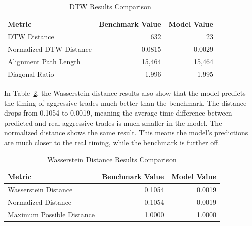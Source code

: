 \begin{table}[H]
    \centering
    \caption{DTW Results Comparison} \label{tb:dtw_com}
    \begin{tabular}{lrr}
    \toprule
    Metric & Benchmark Value & Model Value\\
    \midrule
    DTW Distance & 632 & 23 \\  %
    Normalized DTW Distance & 0.0815 & 0.0029 \\  %
    Alignment Path Length & 15,464 & 15,464 \\
    Diagonal Ratio & 1.996 & 1.995 \\   %
    \bottomrule
    \end{tabular}
\end{table}

In Table~\ref{tb:wasserstein_com}, the Wasserstein distance results also show that the model predicts the timing of aggressive trades much better than the benchmark. The distance drops from 0.1054 to 0.0019, meaning the average time difference between predicted and real aggressive trades is much smaller in the model. The normalized distance shows the same result. This means the model's predictions are much closer to the real timing, while the benchmark is further off.
\begin{table}[H]
    \centering
    \caption{Wasserstein Distance Results Comparison}
    \label{tb:wasserstein_com}
    \begin{tabular}{lrr}
    \toprule
    Metric & Benchmark Value & Model Value\\
    \midrule
    Wasserstein Distance & 0.1054 & 0.0019 \\  %
    Normalized Distance & 0.1054 & 0.0019 \\  %
    Maximum Possible Distance & 1.0000 & 1.0000 \\
    \bottomrule
    \end{tabular}
\end{table}


